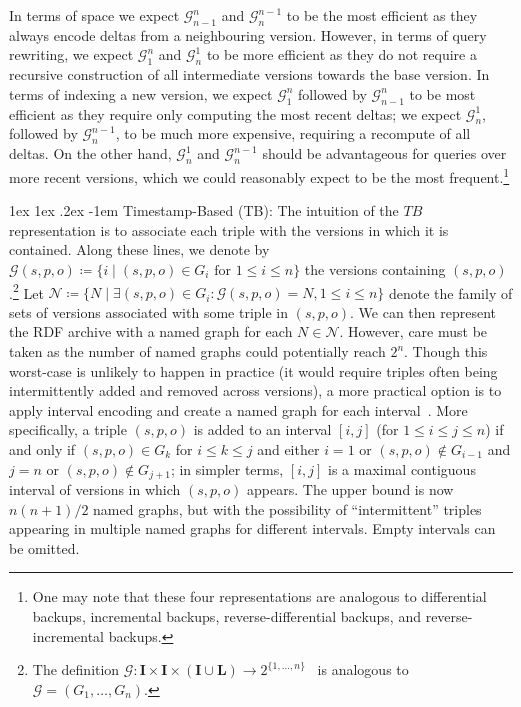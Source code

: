 \documentclass{llncs}
\makeatletter
\renewcommand\paragraph{\@startsection{paragraph}{4}{\z@}%
	{1ex \@plus1ex \@minus.2ex}%
	{-1em}%
	{\normalfont\normalsize\itshape}}
\newcommand{\I}{\ensuremath{\mathbf{I}}\xspace}
\renewcommand{\L}{\ensuremath{\mathbf{L}}\xspace}
\makeatother
\begin{document}
In terms of space we expect $\mathcal{G}^n_{n-1}$ and $\mathcal{G}^{n-1}_n$ to be the most efficient as they always encode deltas from a neighbouring version. However, in terms of query rewriting, we expect $\mathcal{G}^n_{1}$ and $\mathcal{G}^{1}_n$ to be more efficient as they do not require a recursive construction of all intermediate versions towards the base version. In terms of indexing a new version, we expect $\mathcal{G}^{n}_1$ followed by $\mathcal{G}^{n}_{n-1}$ to be most efficient as they require only computing the most recent deltas; we expect $\mathcal{G}^{1}_n$, followed by $\mathcal{G}^{n-1}_{n}$, to be much more expensive, requiring a recompute of all deltas. On the other hand, $\mathcal{G}^{1}_n$ and $\mathcal{G}^{n-1}_{n}$ should be advantageous for queries over more recent versions, which we could reasonably expect to be the most frequent.\footnote{One may note that these four representations are analogous to differential backups, incremental backups, reverse-differential backups, and reverse-incremental backups.}

\paragraph{Timestamp-Based (TB):} The intuition of the $TB$ representation is to associate each triple with the versions in which it is contained. Along these lines, we denote by $\mathcal{G}(s,p,o) \coloneqq \{ i \mid (s,p,o) \in G_i\text{ for } 1 \leq i \leq n \}$ the versions containing $(s,p,o)$.\footnote{The definition $\mathcal{G} : \I \times \I \times (\I \cup \L) \rightarrow 2^{\{1,\ldots,n\}}$~\cite{FernandezUPK19} is analogous to $\mathcal{G} = (G_1,\ldots,G_n)$.} Let $\mathcal{N} \coloneqq \{ N \mid \exists (s,p,o) \in G_i : \mathcal{G}(s,p,o) = N, 1 \leq i \leq n  \}$ denote the family of sets of versions associated with some triple in $(s,p,o)$. We can then represent the RDF archive with a named graph for each $N \in \mathcal{N}$. However, care must be taken as the number of named graphs could potentially reach $2^n$. Though this worst-case is unlikely to happen in practice (it would require triples often being intermittently added and removed across versions), a more practical option is to apply interval encoding and create a named graph for each interval~\cite{FernandezPU15}. More specifically, a triple $(s,p,o)$ is added to an interval $[i,j]$ (for $1 \leq i \leq j \leq n$) if and only if $(s,p,o) \in G_k$ for $i \leq k \leq j$ and either $i = 1$ or $(s,p,o) \notin G_{i-1}$ and $j = n$ or $(s,p,o) \notin G_{j+1}$; in simpler terms, $[i,j]$ is a maximal contiguous interval of versions in which $(s,p,o)$ appears. The upper bound is now $n(n+1)/2$ named graphs, but with the possibility of ``intermittent'' triples appearing in multiple named graphs for different intervals. Empty intervals can be omitted.
\end{document}
